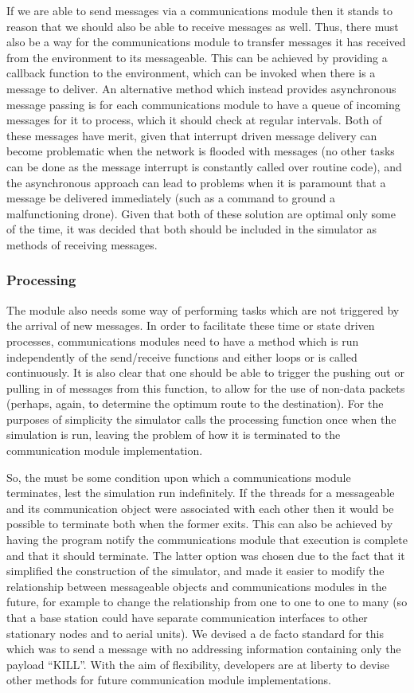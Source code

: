 If we are able to send messages via a communications module then it stands to reason that we should also be able to receive messages as well. Thus, there must also be a way for the communications module to transfer messages it has received from the environment to its messageable. This can be achieved by providing a callback function to the environment, which can be invoked when there is a message to deliver. An alternative method which instead provides asynchronous message passing is for each communications module to have a queue of incoming messages for it to process, which it should check at regular intervals. Both of these messages have merit, given that interrupt driven message delivery can become problematic when the network is flooded with messages (no other tasks can be done as the message interrupt is constantly called over routine code), and the asynchronous approach can lead to problems when it is paramount that a message be delivered immediately (such as a command to ground a malfunctioning drone). Given that both of these solution are optimal only some of the time, it was decided that both should be included in the simulator as methods of receiving messages.

\subsubsection{Processing}
The module also needs some way of performing tasks which are not triggered by the arrival of new messages. In order to facilitate these time or state driven processes, communications modules need to have a method which is run independently of the send/receive functions and either loops or is called continuously. It is also clear that one should be able to trigger the pushing out or pulling in of messages from this function, to allow for the use of non-data packets (perhaps, again, to determine the optimum route to the destination). For the purposes of simplicity the simulator calls the processing function once when the simulation is run, leaving the problem of how it is terminated to the communication module implementation.

So, the must be some condition upon which a communications module terminates, lest the simulation run indefinitely. If the threads for a messageable and its communication object were associated with each other then it would be possible to terminate both when the former exits. This can also be achieved by having the program notify the communications module that execution is complete and that it should terminate. The latter option was chosen due to the fact that it simplified the construction of the simulator, and made it easier to modify the relationship between messageable objects and communications modules in the future, for example to change the relationship from one to one to one to many (so that a base station could have separate communication interfaces to other stationary nodes and to aerial units). We devised a de facto standard for this which was to send a message with no addressing information containing only the payload ``KILL''. With the aim of flexibility, developers are at liberty to devise other methods for future communication module implementations.

